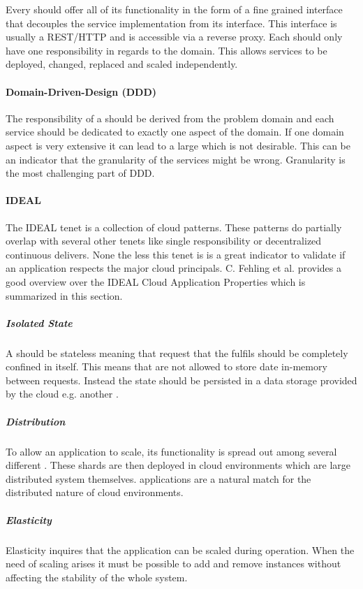 Every \ms{} should offer all of its functionality in the form of a fine grained
interface that decouples the service implementation from its interface. This
interface is usually a REST/HTTP and is accessible via a reverse proxy. Each
\ms{} should only have one responsibility in regards to the domain. This allows
services to be deployed, changed, replaced and scaled independently.

\paragraph{Domain-Driven-Design (DDD)}

The responsibility of a \ms{} should be derived from the problem domain and each
service should be dedicated to exactly one aspect of the domain. If one domain
aspect is very extensive it can lead to a large \ms{} which is not desirable.
This can be an indicator that the granularity of the services might be wrong.
Granularity is the most challenging part of DDD\cite{millett2015patterns}.

\paragraph{IDEAL}

The IDEAL tenet is a collection of cloud patterns. These patterns do partially
overlap with several other tenets like single responsibility or decentralized
continuous delivers. None the less this tenet is is a great indicator to
validate if an application respects the major cloud principals. C. Fehling et
al. provides a good overview over the  IDEAL Cloud Application Properties
which is summarized in this section\cite{fehling2015cloud}.

\subparagraph{Isolated State}
A \ms{} should be stateless meaning that request that the \ms{} fulfils should
be completely confined in itself. This means that \mss{} are not allowed to
store date in-memory between requests. Instead the state should be persisted in
a data storage provided by the cloud e.g. another \ms{}.

\subparagraph{Distribution}
To allow an application to scale, its functionality is spread out among several
different \mss{}. These shards are then deployed in cloud environments which are
large distributed system themselves. \ms{} applications are a natural match for
the distributed nature of cloud environments.

\subparagraph{Elasticity}
Elasticity inquires that the application can be scaled during operation. When
the need of scaling arises it must be possible to add and remove \ms{} instances
without affecting the stability of the whole system.


